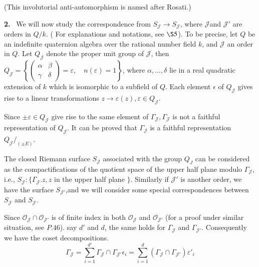   (This involutorial anti-automorphism is named after Rosati.)

\textbf{2.}~ We will now study the correspondence from
$S_{\mathcal{J}}\to S_{\mathcal{J}}$, where
  $\mathcal{J}$and $\mathcal{J'}$ are orders in $Q/k$.  ( For
  explanations and notations, see $\S 5$). To be precise,  let $Q$ be
  an indefinite quaternion algebra over the rational number field $k$,
  and $\mathcal{J}$ an order in $Q$. Let $Q_{\mathcal{J}}$ denote the
  proper unit group of $\mathscr{J}$, then $Q_{\mathcal{J}} = \left\{
  \begin{pmatrix}  \alpha & \beta \\ \gamma & \delta \end{pmatrix} =
  \varepsilon,  \quad  n (\varepsilon) = 1 \right\}$, where $\alpha,
  \ldots,  \delta $ lie in a real quadratic extension of $k$ which is
  isomorphic to a subfield of $Q$. Each element $\epsilon$ of
  $Q_{\mathcal{J}}$ gives 
  rise to  a linear transformations $z \to \varepsilon (z),
  \varepsilon \in Q_{\mathcal{J}}$.  

  \begin{remark*}
    Since $\pm \varepsilon \in Q_{\mathcal{J}}$ give rise to the same
    element of $\Gamma _{\mathcal{J}}, \Gamma _{\mathcal{J}}$ is not a
    faithful representation of $Q_{\mathcal{J}}$. It can be proved
    that $\Gamma_{\mathcal{J}}$ is a faithful representation
    $Q_{\mathcal{J}}/ _{ (\pm E)}$.  
  \end{remark*}
  
  The closed Riemann surface $S_\mathcal{J}$ associated with the group
  $Q_J$ can be considered as the compactifications of the quotient
  space of the upper half plane modulo $\Gamma _{\mathcal{J}} $, i.e.,
  $S_{\mathcal{J}}: \big\{ \Gamma_{\mathcal{J}}.  z,  z $ in the upper
  half plane
  $\big\}$. Similarly if $\mathcal{J}'$  is another order, we have the
  surface $S_{\mathcal{J}'}$,\pageoriginale and we will consider some special
  correspondences between $S_{\mathcal{J}}$ and $S_{\mathcal{J}}$. 

  Since $\mathscr{O}_{\mathcal{J}} \cap \mathscr{O}_{\mathcal{J}'}$ is
  of finite index in both $\mathscr{O}_{\mathcal{J}}$ and
  $\mathscr{O}_{\mathcal{J}'}$ (for a proof under similar 
  situation, see $P.46$). say $d'$ and $d$, the same holds for
  $\Gamma_\mathcal{J} $ and $\Gamma_\mathcal{J'} $.  Consequently we
  have the coset decompositions.  
  $$
  \Gamma_{\mathcal{J}} = \sum^{ d '}_{ i = 1} \Gamma_{\mathcal{J}}
  \cap \Gamma_{\mathcal{J'}}\epsilon_i = \sum^{d}_{ i = 1} (\Gamma_{\mathcal{J}}
  \cap \Gamma_{\mathcal{J}'} )\varepsilon'_i  
  $$

